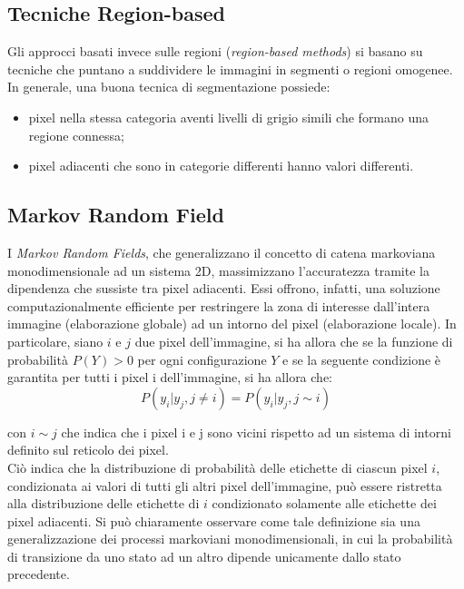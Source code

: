 \subsection*{Tecniche Region-based}
Gli approcci basati invece sulle regioni (\emph{region-based methods}) si basano su tecniche che puntano a suddividere le immagini in segmenti o regioni omogenee. In generale, una buona tecnica di segmentazione possiede:
\begin{itemize}
\item pixel nella stessa categoria aventi livelli di grigio simili che formano una regione connessa;
\item pixel adiacenti che sono in categorie differenti hanno valori differenti. 
\end{itemize}


\subsection*{Markov Random Field}
I \emph{Markov Random Fields}, che generalizzano il concetto di catena markoviana monodimensionale ad un sistema 2D, massimizzano l'accuratezza tramite la dipendenza che sussiste tra pixel adiacenti. 
Essi offrono, infatti, una soluzione computazionalmente efficiente per restringere la zona di interesse dall'intera immagine (elaborazione globale) ad un intorno del pixel (elaborazione locale). 
In particolare, siano $i$ e $j$ due pixel dell'immagine, si ha allora che se la funzione di probabilità $P(Y)>0$ per ogni configurazione $Y$ e se la seguente condizione è garantita per tutti i pixel i dell'immagine, si ha allora che:
\begin{equation}
P(y_i|y_j, j \neq i) = P(y_i|y_j, j\sim i)
\end{equation}   

con $i\sim j$ che indica che i pixel i e j sono vicini rispetto ad un sistema di intorni definito sul reticolo dei pixel.\\

Ciò indica che la distribuzione di probabilità delle etichette di ciascun pixel $i$, condizionata ai valori di tutti gli altri pixel dell'immagine, può essere ristretta alla distribuzione delle etichette di $i$ condizionato solamente alle etichette dei pixel adiacenti. Si può chiaramente osservare come tale definizione sia una generalizzazione dei processi markoviani monodimensionali, in cui la probabilità di transizione da uno stato ad un altro dipende unicamente dallo stato precedente.
    

